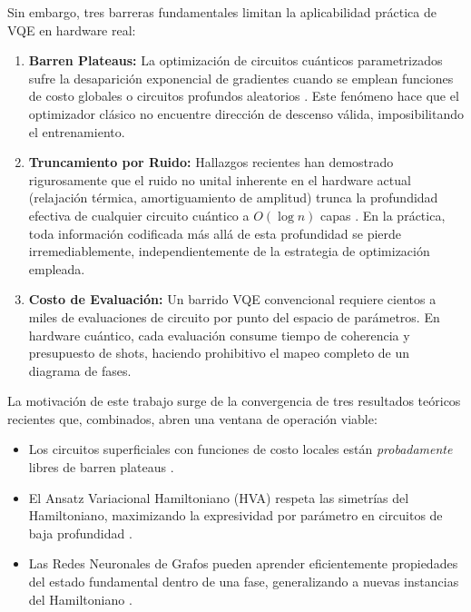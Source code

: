 \documentclass[11pt,a4paper,spanish]{book}
\begin{document}
Sin embargo, tres barreras fundamentales limitan la aplicabilidad práctica de VQE en hardware real:

\begin{enumerate}
    \item \textbf{Barren Plateaus:} La optimización de circuitos cuánticos parametrizados sufre la desaparición exponencial de gradientes cuando se emplean funciones de costo globales o circuitos profundos aleatorios \citep{mcclean2018, cerezo2021}. Este fenómeno hace que el optimizador clásico no encuentre dirección de descenso válida, imposibilitando el entrenamiento.

    \item \textbf{Truncamiento por Ruido:} Hallazgos recientes han demostrado rigurosamente que el ruido no unital inherente en el hardware actual (relajación térmica, amortiguamiento de amplitud) trunca la profundidad efectiva de cualquier circuito cuántico a $O(\log n)$ capas \citep{mele2026}. En la práctica, toda información codificada más allá de esta profundidad se pierde irremediablemente, independientemente de la estrategia de optimización empleada.

    \item \textbf{Costo de Evaluación:} Un barrido VQE convencional requiere cientos a miles de evaluaciones de circuito por punto del espacio de parámetros. En hardware cuántico, cada evaluación consume tiempo de coherencia y presupuesto de shots, haciendo prohibitivo el mapeo completo de un diagrama de fases.
\end{enumerate}

La motivación de este trabajo surge de la convergencia de tres resultados teóricos recientes que, combinados, abren una ventana de operación viable:

\begin{itemize}
    \item Los circuitos superficiales con funciones de costo locales están \emph{probadamente} libres de barren plateaus \citep{cerezo2021, mele2026}.
    \item El Ansatz Variacional Hamiltoniano (HVA) respeta las simetrías del Hamiltoniano, maximizando la expresividad por parámetro en circuitos de baja profundidad \citep{wiersema2020}.
    \item Las Redes Neuronales de Grafos pueden aprender eficientemente propiedades del estado fundamental dentro de una fase, generalizando a nuevas instancias del Hamiltoniano \citep{huang2022}.
\end{itemize}
\end{document}
